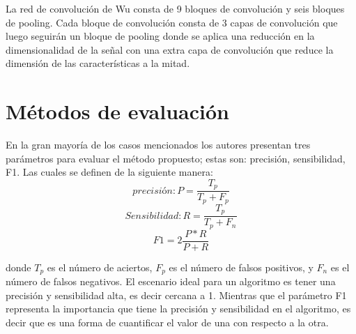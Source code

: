 \documentclass[../main.tex]{subfiles}
\begin{document}
La red de convolución de Wu consta de 9 bloques de convolución y seis bloques de pooling. Cada bloque de convolución consta de 3 capas de convolución que luego seguirán un bloque de pooling donde se aplica una reducción en la dimensionalidad de la señal con una extra capa de convolución que reduce la dimensión de las características a la mitad. 


\section{Métodos de evaluación}

En la gran mayoría de los casos mencionados los autores presentan tres parámetros para evaluar el método propuesto; estas son: precisión, sensibilidad, F1. Las cuales se definen de la siguiente manera:\\

\begin{equation}
    precisión: P = \frac{T_p}{T_p + F_p}
\end{equation}
\begin{equation}
    Sensibilidad: R = \frac{T_p}{T_p + F_n}
\end{equation}
\begin{equation}
    F1 = 2\frac{P*R}{P + R}
\end{equation}

donde $T_p$ es el número de aciertos, $F_p$ es el número de falsos positivos, y $F_n$ es el número de falsos negativos. El escenario ideal para un algoritmo es tener una precisión y sensibilidad alta, es decir cercana a 1. Mientras que el parámetro F1 representa la importancia que tiene la precisión y sensibilidad en el algoritmo, es decir que es una forma de cuantificar el valor de una con respecto a la otra. \\
\end{document}
